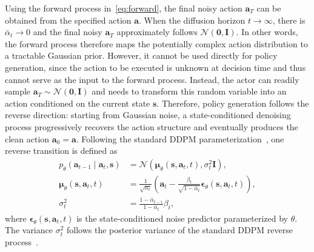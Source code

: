 \documentclass[9pt,journal]{IEEEtran}
\newcommand{\va}{\bm{a}}
\newcommand{\vs}{\bm{s}}
\newcommand{\veps}{\bm{\epsilon}}
\begin{document}
Using the forward process in~\eqref{eq:forward}, the final noisy action
$\va_T$ can be obtained from the specified action $\va$. When the
diffusion horizon $t\rightarrow\infty$, there is $\bar\alpha_t \rightarrow 0$ and the final noisy
$\va_T$ approximately follows $\mathcal N(\bm0,\bm I)$.
In other words, the forward process therefore maps the potentially complex action
distribution to a tractable Gaussian prior. However, it cannot be used
directly for policy generation, since the action to be executed is
unknown at decision time and thus cannot serve as the input to the
forward process. Instead, the actor can readily sample
$\va_T\sim\mathcal N(\bm0,\bm I)$ and needs to transform this random
variable into an action conditioned on the current state $\vs$.
Therefore, policy generation follows the reverse direction: starting
from Gaussian noise, a state-conditioned denoising process progressively
recovers the action structure and eventually produces the clean action
$\va_0=\va$. Following the standard DDPM
parameterization~\cite{ho2020ddpm}, one reverse transition is defined as
\begin{subequations}\label{eq:reverse_ddpm}
\begin{align}
    p_\theta\!\left(\va_{t-1}\mid\va_t,\vs\right)
    &=
    \mathcal N\!\left(
    \bm\mu_\theta\!\left(\vs,\va_t,t\right),
    \sigma_t^2\bm I
    \right),
    \label{eq:reverse_transition}
    \\
    \bm\mu_\theta\!\left(\vs,\va_t,t\right)
    &=
    \frac{1}{\sqrt{\alpha_t}}
    \left(
    \va_t-
    \frac{\beta_t}{\sqrt{1-\bar\alpha_t}}
    \veps_\theta\!\left(\vs,\va_t,t\right)
    \right),
    \label{eq:reverse_mean}
    \\
    \sigma_t^2
    &=
    \frac{1-\bar\alpha_{t-1}}
         {1-\bar\alpha_t}\beta_t,
    \label{eq:reverse_variance}
\end{align}
\end{subequations}
where $\veps_\theta(\vs,\va_t,t)$ is the state-conditioned noise
predictor parameterized by $\theta$. The variance $\sigma_t^2$ follows the posterior variance of the standard DDPM reverse process~\cite{ho2020ddpm}.
\end{document}
